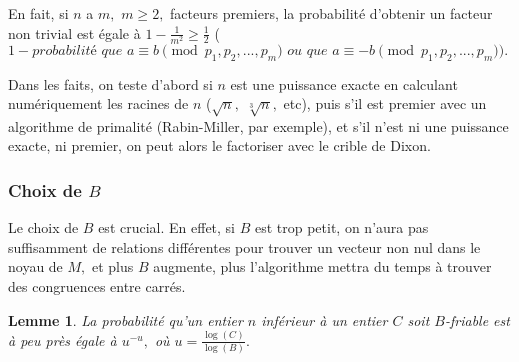 \documentclass[french, 12pt, titlepage]{article}
\newtheorem{lemme}{Lemme}
\begin{document}
En fait, si $n$ a $m,$ $m \geq 2,$ facteurs premiers, la probabilité d'obtenir un
facteur non trivial est égale à $1 - \frac{1}{m^2} \geq \frac{1}{2}$
($1 - \textit{probabilité que } a \equiv b \pmod {p_1, p_2, ..., p_m} \textit{ ou que } a \equiv -b \pmod {p_1, p_2, ..., p_m}).$

Dans les faits, on teste d'abord si $n$ est une puissance exacte en calculant numériquement les racines de $n$ ($\sqrt{n},$ $\sqrt[3]{n},$ etc), puis s'il est premier avec un algorithme de primalité (Rabin-Miller, par
exemple), et s'il n'est ni une puissance exacte, ni premier, on peut alors le
factoriser avec le crible de Dixon.


\subsubsection{Choix de $B$}

Le choix de $B$ est crucial. En effet, si $B$ est trop petit, on
n'aura pas suffisamment de relations différentes pour trouver un
vecteur non nul dans le noyau de $M,$ et plus $B$ augmente, plus
l'algorithme mettra du temps à trouver des congruences entre carrés. 

\begin{lemme}
La probabilité qu'un entier $n$ inférieur à un entier $C$ soit
$B$-friable est à peu près égale à $u^{-u},$ où $u = \frac{\log(C)}{\log(B)}.$
\end{lemme}
\end{document}
